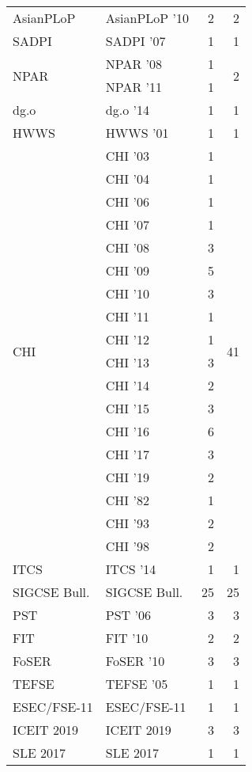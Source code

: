 \begin{table*}[t]
\begin{tabular}{llrr}
\multirow{1}{*}{AsianPLoP } & AsianPLoP '10 & 2 & \multirow{1}{*}{2}\\
\multirow{1}{*}{SADPI } & SADPI '07 & 1 & \multirow{1}{*}{1}\\
\multirow{2}{*}{NPAR } & NPAR '08 & 1 & \multirow{2}{*}{2}\\
& NPAR '11 & 1 &\\
\multirow{1}{*}{dg.o } & dg.o '14 & 1 & \multirow{1}{*}{1}\\
\multirow{1}{*}{HWWS } & HWWS '01 & 1 & \multirow{1}{*}{1}\\
\multirow{18}{*}{CHI } & CHI '03 & 1 & \multirow{18}{*}{41}\\
& CHI '04 & 1 &\\
& CHI '06 & 1 &\\
& CHI '07 & 1 &\\
& CHI '08 & 3 &\\
& CHI '09 & 5 &\\
& CHI '10 & 3 &\\
& CHI '11 & 1 &\\
& CHI '12 & 1 &\\
& CHI '13 & 3 &\\
& CHI '14 & 2 &\\
& CHI '15 & 3 &\\
& CHI '16 & 6 &\\
& CHI '17 & 3 &\\
& CHI '19 & 2 &\\
& CHI '82 & 1 &\\
& CHI '93 & 2 &\\
& CHI '98 & 2 &\\
\multirow{1}{*}{ITCS } & ITCS '14 & 1 & \multirow{1}{*}{1}\\
\multirow{1}{*}{SIGCSE Bull.} & SIGCSE Bull. & 25 & \multirow{1}{*}{25}\\
\multirow{1}{*}{PST } & PST '06 & 3 & \multirow{1}{*}{3}\\
\multirow{1}{*}{FIT } & FIT '10 & 2 & \multirow{1}{*}{2}\\
\multirow{1}{*}{FoSER } & FoSER '10 & 3 & \multirow{1}{*}{3}\\
\multirow{1}{*}{TEFSE } & TEFSE '05 & 1 & \multirow{1}{*}{1}\\
\multirow{1}{*}{ESEC/FSE-11} & ESEC/FSE-11 & 1 & \multirow{1}{*}{1}\\
\multirow{1}{*}{ICEIT 2019} & ICEIT 2019 & 3 & \multirow{1}{*}{3}\\
\multirow{1}{*}{SLE 2017} & SLE 2017 & 1 & \multirow{1}{*}{1}\\

\end{tabular}
\end{table*}
